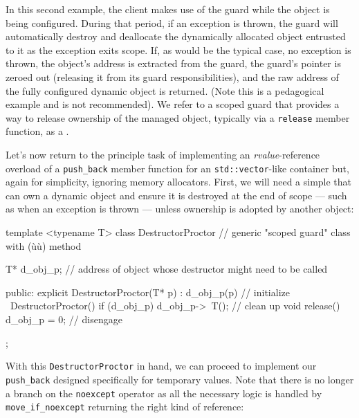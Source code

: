 \noindent In this second example, the client makes use of the guard while the
object is being configured. During that period, if an exception is
thrown, the guard will automatically destroy and deallocate the
dynamically allocated object entrusted to it as the exception exits
scope. If, as would be the typical case, no exception is thrown, the
object's address is extracted from the guard, the guard's pointer is
zeroed out (releasing it from its guard responsibilities), and the raw
address of the fully configured dynamic object is returned. (Note this
is a pedagogical example and is not recommended). We refer to a scoped
guard that provides a way to release ownership of the managed object,
typically via a \lstinline!release! member function, as a .

Let's now return to the principle task of implementing an
\emph{rvalue}-reference overload of a \lstinline!push_back! member
function for an \lstinline!std::vector!-like container but, again for
simplicity, ignoring memory allocators. First, we will need a simple
 that can own a dynamic object and ensure it is
destroyed at the end of scope --- such as when an exception is thrown
--- unless ownership is adopted by another object:

\begin{emcppslisting}[emcppsbatch={e23,e25}]
template <typename T>
class DestructorProctor  // generic "scoped guard" class with (ù{}ù) method
{
    T* d_obj_p;  // address of object whose destructor might need to be called

public:
    explicit DestructorProctor(T* p) : d_obj_p(p) { }        // initialize
    ~DestructorProctor() { if (d_obj_p) { d_obj_p->~T(); } } // clean up
    void release() { d_obj_p = 0; }                          // disengage
};
\end{emcppslisting}
    

\noindent With this \lstinline!DestructorProctor! in hand, we can proceed to
implement our \lstinline!push_back! designed specifically for temporary
values. Note that there is no longer a branch on the \lstinline!noexcept!
operator as all the necessary logic is handled by
\lstinline!move_if_noexcept! returning the right kind of reference:

